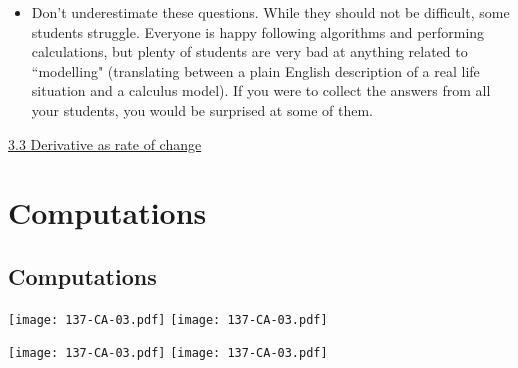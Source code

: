 \documentclass[11pt]{article}
\newcommand{\nl}{\hfill \vspace{-1.1\baselineskip}} %
\newcommand{\viii}{\hspace{8mm} \href{https://www.youtube.com/watch?v=fUjLN1ZEDBc&list=PLlwePzQY_wW8qiZD6XYqCnibdY37ygbx7&index=3}{3.3 Derivative as rate of change}}
\begin{document}
\begin{comments}
\nl
	\begin{itemize}
		\item  Don't underestimate these questions.  While they should not be difficult, some students struggle.  Everyone is happy following algorithms and performing calculations, but plenty of students are very bad at anything related to ``modelling" (translating between a plain English description of a real life situation and a calculus model).  If you were to collect the answers from all your students, you would be surprised at some of them.
	\end{itemize}	
\end{comments}

\begin{videos}
\viii
\end{videos}

\newpage


\section{Computations}


\subsection{Computations} 

\begin{center}
{ \texttt{[image: 137-CA-03.pdf]}} \quad
{ \texttt{[image: 137-CA-03.pdf]}}

{ \texttt{[image: 137-CA-03.pdf]}} \quad
{ \texttt{[image: 137-CA-03.pdf]}}

\end{center}
\end{document}
